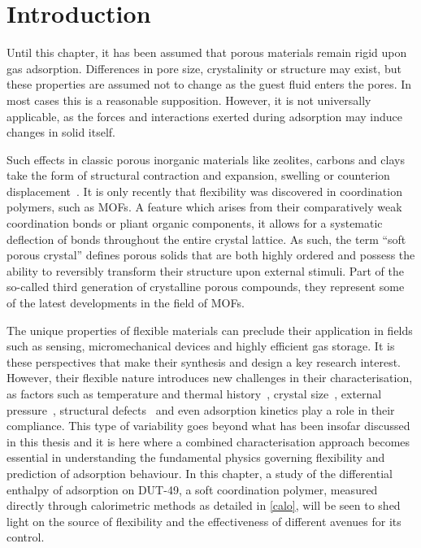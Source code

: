 
\section{Introduction}

Until this chapter, it has been assumed that porous materials 
remain rigid upon gas adsorption. Differences in pore size, crystalinity 
or structure may exist, but these properties are assumed not to change
as the guest fluid enters the pores.
In most cases this is a reasonable supposition. However, it is not 
universally applicable, as the forces and interactions exerted 
during adsorption may induce changes in solid itself.

Such effects in classic porous inorganic materials like zeolites, carbons 
and clays take the form of structural contraction and expansion, swelling
or counterion displacement~\cite{coudertMolecularInsightCO2017}.
It is only recently that flexibility was discovered in coordination
polymers, such as \glspl{MOF}. A feature which arises from 
their comparatively weak coordination bonds or pliant organic components,
it allows for a systematic deflection of bonds throughout the 
entire crystal lattice.
As such, the term ``soft porous crystal'' defines porous solids that are 
both highly ordered and possess the ability to reversibly transform
their structure upon external stimuli. Part of the so-called
third generation of crystalline porous compounds, they represent 
some of the latest developments in the field of \glspl{MOF}.

The unique properties of flexible materials can preclude
their application in fields such as sensing, micromechanical
devices and highly efficient gas storage. It is these perspectives
that make their synthesis and design a key research interest.
However, their flexible nature introduces new challenges in
their characterisation, as factors such as temperature and
thermal history~\cite{liuReversibleStructuralTransition2008},
crystal size~\cite{zhangCrystalSizeDependentStructuralTransitions2014, %
krauseEffectCrystalliteSize2018}, external 
pressure~\cite{itoReversiblePoreSize2013, %
chanutUsingExternalFactors2016}, structural defects~\cite{bennettInterplayDefectsDisorder2016} 
and even adsorption kinetics play a role in their compliance.
This type of variability goes beyond what has been insofar discussed
in this thesis and it is here where a combined characterisation approach
becomes essential in understanding the fundamental physics
governing flexibility and prediction of adsorption behaviour.
In this chapter, a study of the differential enthalpy of adsorption
on DUT-49, a soft coordination polymer,
measured directly through calorimetric methods as detailed in 
\autoref{calo}, will be seen to shed light on the source of 
flexibility and the effectiveness of different avenues for its
control.


